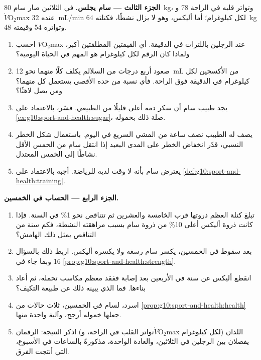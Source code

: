 \begin{problem}
\medskip
\noindent\textbf{الجزء الثالث --- سام يجلس.}
في الثلاثين صار سام \qty{80}{kg}، وتواتر قلبه في الراحة 78 و
$\dot V\!\mathrm{O_2}$max عنده \qty{32}{mL/min} لكل كيلوغرام؛ أما
أليكس، وهو لا يزال نشطًا، فكتلته \qty{64}{kg} وتواتره 54 وقيمته \num{48}.
\begin{enumerate}[resume]
  \item احسب $\dot V\!\mathrm{O_2}$max عند الرجلين باللترات في
        الدقيقة. أي القيمتين المطلقتين أكبر، ولماذا كان الرقم لكل
        كيلوغرام هو المهم في الحياة اليومية؟
  \item صعود أربع درجات من السلالم يكلف كلًا منهما نحو \qty{12}{mL} من
        الأكسجين لكل كيلوغرام في الدقيقة فوق الراحة. فأي نسبة من حده
        الأقصى يستعمل كل منهما؟ ومن يصل لاهثًا؟
  \item يجد طبيب سام أن سكر دمه أعلى قليلًا من الطبيعي. فسّر، بالاعتماد على
        \cref{ex:g10:sport-and-health:sugar}، صلة ذلك بخموله.
  \item يصف له الطبيب نصف ساعة من المشي السريع في اليوم. باستعمال شكل
        الخطر النسبي، قدّر انخفاض الخطر على المدى البعيد إذا انتقل سام
        من الخمس الأقل نشاطًا إلى الخمس المعتدل.
  \item يعترض سام بأنه لا وقت لديه للرياضة. أجبه بالاعتماد على
        \cref{def:g10:sport-and-health:training}.
\end{enumerate}

\medskip
\noindent\textbf{الجزء الرابع --- الحساب في الخمسين.}
\begin{enumerate}[resume]
  \item تبلغ كتلة العظم ذروتها قرب الخامسة والعشرين ثم تتناقص نحو
        1\% في السنة. فإذا كانت ذروة أليكس أعلى 10\% من ذروة سام بسبب
        مراهقته النشطة، فكم سنة من التناقص يمثل ذلك الهامش؟
  \item بعد سقوط في الخمسين، يكسر سام رسغه ولا يكسره أليكس. اربط ذلك
        بالسؤال 16 وبما جاء في \cref{prop:g10:sport-and-health:strength}.
  \item انقطع أليكس عن  سنة في الأربعين بعد إصابة ففقد معظم
        مكاسب تحمله، ثم أعاد بناءها. فما الذي يبينه ذلك عن طبيعة
        التكيف؟
  \item اسرد، لسام في الخمسين، ثلاث حالات من
        \cref{prop:g10:sport-and-health:health} جعلها خموله أرجح،
        وآلية واحدة منها.
  \item اذكر النتيجة: الرقمان (تواتر القلب في الراحة،
        و$\dot V\!\mathrm{O_2}$max لكل كيلوغرام) اللذان يفصلان بين
        الرجلين في الثلاثين، والعادة الواحدة، مذكورةً بالساعات في
        الأسبوع، التي أنتجت الفرق.
\end{enumerate}
\end{problem}

